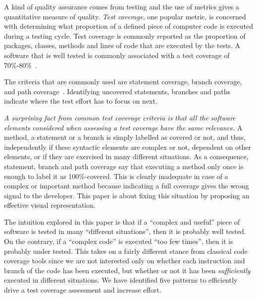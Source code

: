 \documentclass{sig-alternate}
\begin{document}

A kind of quality assurance comes from testing and the use of metrics gives a quantitative measure of quality. \emph{Test coverage}, one popular  metric, is concerned with determining what proportion of a defined piece of computer code is  executed during a testing cycle. 
Test coverage is commonly reported as the proportion of packages, classes, methods and lines of code that are executed by the tests. 
A software that is well tested is commonly associated with a test coverage of 70\%-80\%~\cite{Mock09a}. %


The criteria that are commonly used are statement coverage, branch coverage, and path coverage~\cite{Hong97a}. 
Identifying uncovered statements, branches and paths indicate where the test effort has to focus on next.

\textit{A surprising fact from common test coverage criteria is that all the software elements considered when assessing a test coverage have the same relevance.} A method, a statement or a branch is simply labelled as covered or not, and thus, independently if these syntactic elements are complex or not, dependent on other elements, or if they are exercised in many different situations.
As a consequence, statement, branch and path coverage say that executing a method only once is enough to label it as 100\%-covered. This is clearly inadequate in case of a complex or important method because indicating a full coverage gives the wrong signal to the developer.
This paper is about fixing this situation by proposing an effective visual representation.

The intuition explored in this paper is that if a ``complex and useful'' piece of software is tested in many ``different situations'', then it is probably well tested. On the contrary, if a ``complex code'' is executed ``too few times'', then it is probably under tested. This takes on a fairly different stance from classical code coverage tools since we are not interested only on whether each instruction and branch of the code has been executed, but whether or not it has been \emph{sufficiently} executed in different situations. We have identified five patterns to efficiently drive a test coverage assessment and increase effort.
\end{document}
